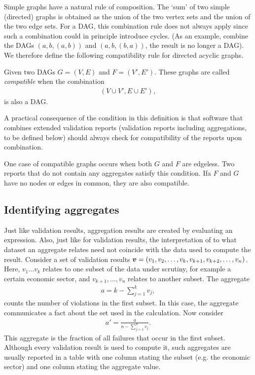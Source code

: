 Simple graphs have a natural rule of composition. The `sum' of two simple
(directed) graphs is obtained as the union of the two vertex sets and the union
of the two edge sets. For a DAG, this combination rule does not always apply
since such a combination could in principle introduce cycles. (As an example,
combine the DAGs $({a,b},{(a,b)})$ and $({a,b},{(b,a)})$, the result is no
longer a DAG). We therefore define the following compatibility rule for
directed acyclic graphs.
\begin{definition}
\label{def:compatibledag}
Given two DAGs $G=(V,E)$ and $F=(V',E')$. These graphs are called
\emph{compatible} when the combination
\begin{align*}
 (V\cup V', E\cup E'),
\end{align*}
is also a DAG.
\end{definition}
A practical consequence of the condition in this definition is that software
that combines extended validation reports (validation reports including
aggregations, to be defined below) should always check for compatibility of the
reports upon combination. 

One case of compatible graphs occurs when both $G$ and $F$ are edgeless. Two
reports that do not contain any aggregates satisfy this condition. Ifa $F$ and
$G$ have no nodes or edges in common, they are also compatible. 


\subsection{Identifying aggregates}
Just like validation results, aggregation results are created by evaluating an
expression. Also, just like for validation results, the interpretation of to
what dataset an aggregate relates need not coincide with the data used to
compute the result. Consider a set of validation results
$\boldsymbol{v}=(v_1,v_2,\ldots,v_k,v_{k+1},v_{k+2},\ldots, v_n)$. Here,
$v_1\ldots v_k$ relates to one subset of the data under scrutiny, for example a
certain economic sector, and $v_{k+1},\ldots,v_n$ relates to another subset.
The aggregate
\begin{align*}
a = k - \sum_{j=1}^{k}v_j,
\end{align*}
counts the number of violations in the first subset. In this case, the
aggregate communicates a fact about the set used in the calculation.
Now consider
\begin{align*}
a' = \frac{a}{n-\sum_{j=1}^n{v_j}}.
\end{align*}
This aggregate is the fraction of all failures that occur in the first subset.
Although every validation result is used to compute it, such aggregates are
usually reported in a table with one column stating the subset (e.g. the
economic sector) and one column stating the aggregate value. 

